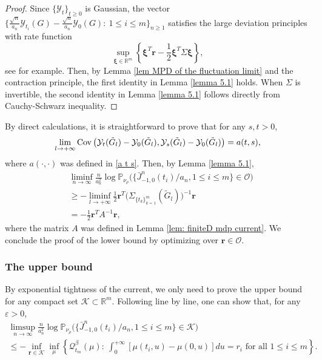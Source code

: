 \documentclass[reqno,11pt]{amsart}
\numberwithin{equation}{section}
\newcommand{\R}{\mathbb{R}}
\begin{document}
\begin{proof}
	Since $\{\mathcal{Y}_t\}_{t\geq 0}$ is Gaussian,   the vector $\{\frac{\sqrt{n}}{a_n}\mathcal{Y}_{t_i}(G)-\frac{\sqrt{n}}{a_n}\mathcal{Y}_{0}(G):~1\leq i\leq m\}_{n\geq 1}$ satisfies the large deviation principles  with rate function 
	\[\sup_{\bm{\xi}\in \R^m}\left\{\bm{\xi}^T \mathbf{r}-\frac{1}{2} \bm{\xi}^T \Sigma \bm{\xi} \right\},\]
	see \cite{deuschel1989large} for example. Then, by Lemma \ref{lem MPD of the fluctuation limit} and the contraction principle, the first identity in Lemma \ref{lemma 5.1} holds. When $\Sigma$ is invertible, the second identity in Lemma \ref{lemma 5.1} follows directly from 
	Cauchy-Schwarz inequality. 
\end{proof}

By direct calculations, it is straightforward to prove that  for any $s,t > 0$,
\begin{equation}\label{cov converg}
\lim_{l\rightarrow+\infty}{\rm Cov}\left(\mathcal{Y}_t(\tilde{G}_l)-\mathcal{Y}_0(\tilde{G}_l), \mathcal{Y}_s(\tilde{G}_l)-\mathcal{Y}_0(\tilde{G}_l)\right) = a(t,s),
\end{equation}
where $a(\cdot,\cdot)$ was defined in \eqref{a t s}. Then, by Lemma \ref{lemma 5.1}, 
\begin{align*}
	&\liminf_{n \rightarrow \infty} \frac{n}{a_n^2} \log \mathbb{P}_{\nu_{\rho}} \Big( \{\bar{J}^n_{-1,0} (t_i)/a_n, 1 \leq i \leq m\} \in \mathcal{O} \Big) \\
	&\geq - \liminf_{l\rightarrow+\infty}  \frac{1}{2} \mathbf{r}^T \big(\Sigma_{\{t_k\}_{k=1}^m}(\tilde{G}_l)\big)^{-1} \mathbf{r} \\
	&=  - \frac{1}{2} \mathbf{r}^T A^{-1} \mathbf{r},
\end{align*}
where the matrix $A$ was defined in Lemma \ref{lem: finiteD mdp current}.  We conclude the proof of the lower bound by optimizing over $\mathbf{r} \in \mathcal{O}$. 

\subsubsection{The upper bound} By exponential tightness of the current, we only need to prove the upper bound for any compact set $\mathcal{K} \subset \R^m$. Following \cite[Proof of (6.1)]{xue2024sample}  line by line, one can show that, for any $\varepsilon > 0$,
\begin{multline*}
	\limsup_{n \rightarrow \infty} \frac{n}{a_n^2} \log \mathbb{P}_{\nu_{\rho}} \Big( \{\bar{J}^n_{-1,0} (t_i)/a_n, 1 \leq i \leq m\} \in \mathcal{K} \Big)\\
	\leq - \inf_{\mathbf{r} \in \mathcal{K}} \inf_{\mu}  \left\{\mathcal{Q}^\beta_{t_m} (\mu):~\int_0^{+\infty}[\mu(t_i,u)-\mu(0, u)]du=r_i\text{~for all~}1\leq i\leq m\right\}.
\end{multline*}
\end{document}
